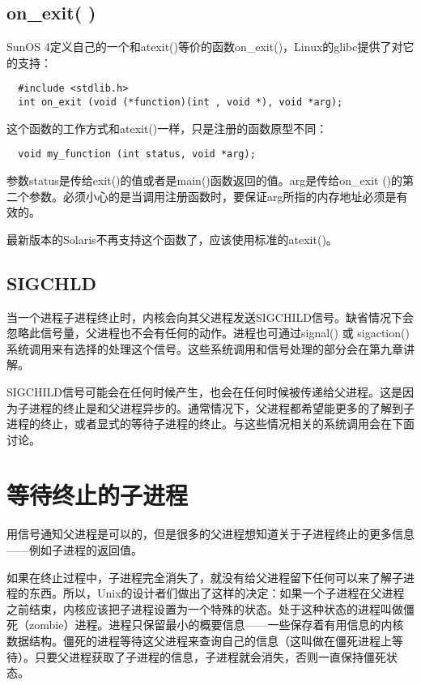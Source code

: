 \subsection{on\_exit( )}

SunOS 4定义自己的一个和atexit()等价的函数on\_exit()，Linux的glibc提供了对它的支持：

\begin{lstlisting}
  #include <stdlib.h>
  int on_exit (void (*function)(int , void *), void *arg);
\end{lstlisting}

这个函数的工作方式和atexit()一样，只是注册的函数原型不同：

\begin{lstlisting}
  void my_function (int status, void *arg);
\end{lstlisting}

参数status是传给exit()的值或者是main()函数返回的值。arg是传给on\_exit ()的第二个参数。必须小心的是当调用注册函数时，要保证arg所指的内存地址必须是有效的。

最新版本的Solaris不再支持这个函数了，应该使用标准的atexit()。

\subsection{SIGCHLD}

当一个进程子进程终止时，内核会向其父进程发送SIGCHILD信号。缺省情况下会忽略此信号量，父进程也不会有任何的动作。进程也可通过signal() 或 sigaction()系统调用来有选择的处理这个信号。这些系统调用和信号处理的部分会在第九章讲解。

SIGCHILD信号可能会在任何时候产生，也会在任何时候被传递给父进程。这是因为子进程的终止是和父进程异步的。通常情况下，父进程都希望能更多的了解到子进程的终止，或者显式的等待子进程的终止。与这些情况相关的系统调用会在下面讨论。

\section{等待终止的子进程}

用信号通知父进程是可以的，但是很多的父进程想知道关于子进程终止的更多信息——例如子进程的返回值。

如果在终止过程中，子进程完全消失了，就没有给父进程留下任何可以来了解子进程的东西。所以，Unix的设计者们做出了这样的决定：如果一个子进程在父进程之前结束，内核应该把子进程设置为一个特殊的状态。处于这种状态的进程叫做僵死（zombie）进程。进程只保留最小的概要信息——一些保存着有用信息的内核数据结构。僵死的进程等待这父进程来查询自己的信息（这叫做在僵死进程上等待）。只要父进程获取了子进程的信息，子进程就会消失，否则一直保持僵死状态。

